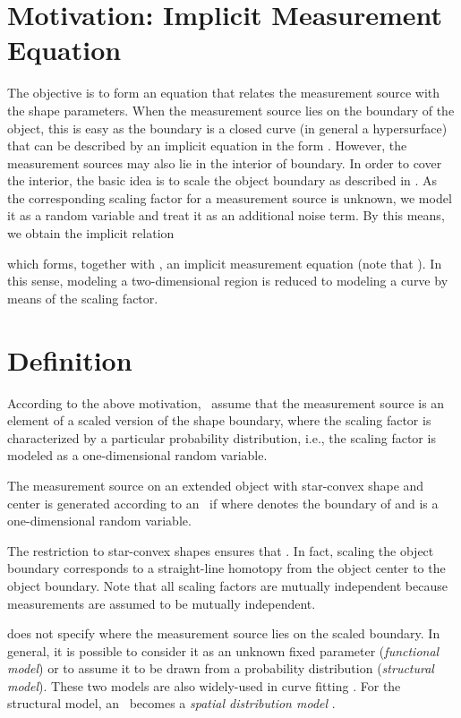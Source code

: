 \documentclass[preprint,1p,11pt]{ISAS_IR}
\newcommand{\placeFig}[1]{}
\begin{document}
\section{Motivation: Implicit  Measurement Equation}\label{sec:rhmmotivation}
The objective is to  form  an equation that  relates the measurement source with the shape parameters.
When the measurement source  lies on the boundary of the object, this is easy as
the boundary is a closed curve (in general a hypersurface) that can be described by an implicit equation in the form  .
However, the measurement sources may  also lie in the interior of boundary. In order to cover the interior, the basic idea is to scale the object boundary as described in  .
As the corresponding scaling factor  for a measurement source    is unknown, we model it as a random variable and treat it as an additional noise term. By this means, we obtain the implicit relation 

which forms, together with  ,    an implicit measurement equation (note that ). 
In this sense,  modeling a two-dimensional region is reduced to modeling a curve by means of the scaling factor. 


\placeFig{3}

\section{Definition}
According to the above motivation,  \rhms\ assume that the measurement source is  an element of a  scaled version of the  shape boundary, where the scaling factor is characterized by a particular  probability distribution, i.e., the scaling factor is modeled as a one-dimensional random variable.
 
\begin{Definition}\label{def:rhm}
The measurement source  on an extended object with star-convex shape  and center   is generated according to an \rhm\ if  
    where  denotes the boundary of     and      is a  one-dimensional random variable.
\end{Definition}
 
 The restriction to star-convex shapes ensures that  . In fact, scaling the object boundary corresponds to   a straight-line homotopy from the object center to the object boundary.
Note that all scaling factors    are mutually  independent because measurements are assumed to be mutually independent.
 
 does not specify where the measurement source  lies on the scaled boundary.
In general, it is possible to consider it as an unknown fixed parameter  (\emph{functional model}) or to assume  it to be drawn from a probability distribution (\emph{structural model}). These two models are also widely-used  in curve fitting \cite{Chernov2009}.
For the structural model, an \rhm\ becomes a \emph{spatial distribution model} \cite{Gilholm2005,G2005}.
\end{document}
